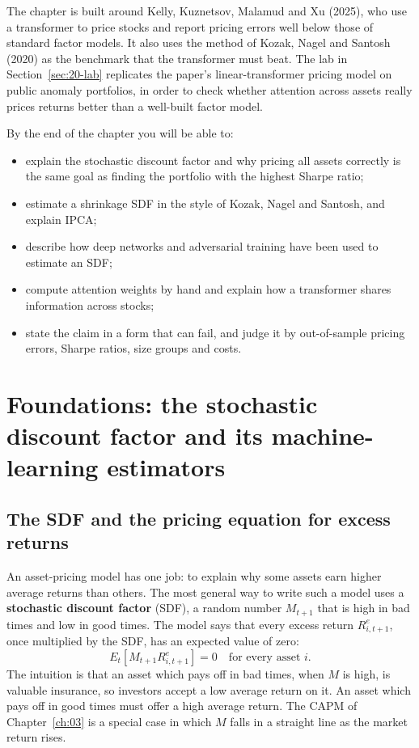 The chapter is built around Kelly, Kuznetsov, Malamud and Xu (2025), who use a transformer to price stocks and report pricing errors well below those of standard factor models. It also uses the method of Kozak, Nagel and Santosh (2020) as the benchmark that the transformer must beat. The lab in Section~\ref{sec:20-lab} replicates the paper's linear-transformer pricing model on public anomaly portfolios, in order to check whether attention across assets really prices returns better than a well-built factor model.

By the end of the chapter you will be able to:

\begin{itemize}
  \item explain the stochastic discount factor and why pricing all assets correctly is the same goal as finding the portfolio with the highest Sharpe ratio;
  \item estimate a shrinkage SDF in the style of Kozak, Nagel and Santosh, and explain IPCA;
  \item describe how deep networks and adversarial training have been used to estimate an SDF;
  \item compute attention weights by hand and explain how a transformer shares information across stocks;
  \item state the claim in a form that can fail, and judge it by out-of-sample pricing errors, Sharpe ratios, size groups and costs.
\end{itemize}

\section{Foundations: the stochastic discount factor and its machine-learning estimators}
\label{sec:20-foundations}

\subsection{The SDF and the pricing equation for excess returns}

An asset-pricing model has one job: to explain why some assets earn higher average returns than others. The most general way to write such a model uses a \textbf{stochastic discount factor} (SDF), a random number $M_{t+1}$ that is high in bad times and low in good times. The model says that every excess return $R^e_{i,t+1}$, once multiplied by the SDF, has an expected value of zero:
\begin{equation}
  E_t\!\left[ M_{t+1} R^e_{i,t+1} \right] = 0 \quad \text{for every asset } i.
  \label{eq:20-pricing}
\end{equation}
The intuition is that an asset which pays off in bad times, when $M$ is high, is valuable insurance, so investors accept a low average return on it. An asset which pays off in good times must offer a high average return. The CAPM of Chapter~\ref{ch:03} is a special case in which $M$ falls in a straight line as the market return rises.

